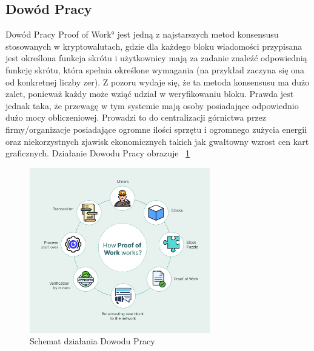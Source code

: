 \subsection{Dowód Pracy}
\label{ssec:PoW}
Dowód Pracy \ang{Proof of Work} jest jedną z najstarszych metod konsensusu stosowanych w kryptowalutach, gdzie dla każdego bloku wiadomości przypisana jest określona funkcja skrótu i użytkownicy mają za zadanie znaleźć odpowiednią funkcję skrótu, która spełnia określone wymagania (na przykład zaczyna się ona od konkretnej liczby zer). Z pozoru wydaje się, że ta metoda konsensusu ma dużo zalet, ponieważ każdy może wziąć udział w weryfikowaniu bloku. Prawda jest jednak taka, że przewagę w tym systemie mają osoby posiadające odpowiednio dużo mocy obliczeniowej. Prowadzi to do centralizacji górnictwa przez firmy/organizacje posiadające ogromne ilości sprzętu i ogromnego zużycia energii oraz niekorzystnych zjawisk ekonomicznych takich jak gwałtowny wzrost cen kart graficznych.
Działanie Dowodu Pracy obrazuje \figurename{~\ref{fig:ConsesnsusProofOfWork}}
\begin{figure}[H]
    \centering
    \includegraphics[width=0.7\textwidth]{Images/ConsesnsusProofOfWork.png}
    \caption{Schemat działania Dowodu Pracy}
    \label{fig:ConsesnsusProofOfWork}
\end{figure}
